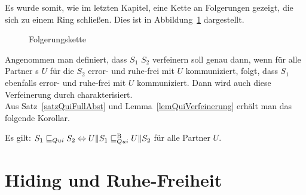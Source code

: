 Es wurde somit, wie im letzten Kapitel, eine Kette an Folgerungen gezeigt, die
sich zu einem Ring schließen. Dies ist in Abbildung~\ref{FolgerungsketteQui}
dargestellt.

\begin{figure}[h!tbp]
  \begin{center}
    \caption{Folgerungskette}
\label{FolgerungsketteQui}
  \end{center}
\end{figure}

Angenommen man definiert, dass $S_1$ $S_2$ verfeinern
soll genau dann, wenn für alle Partner \EIO{}s $U$ für die $S_2$ error- und
ruhe-frei mit $U$ kommuniziert, folgt, dass $S_1$ ebenfalls error- und
ruhe-frei mit $U$ kommuniziert. Dann wird auch diese Verfeinerung durch \QRel{}
charakterisiert.\\
Aus Satz~\ref{satzQuiFullAbst} und Lemma~\ref{lemQuiVerfeinerung} erhält man
das folgende Korollar.

\begin{kor}
  Es gilt: $S_1\sqsubseteq _{Qui} S_2\Leftrightarrow U\|S_1\sqsubseteq _{Qui}^\mathrm{B} U\|S_2$ für alle Partner
  $U$.
\end{kor}

\section{Hiding und Ruhe-Freiheit}

